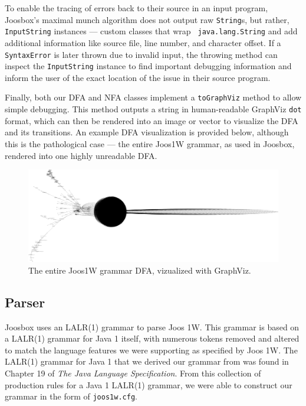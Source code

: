 \documentclass[letterpaper]{article}
\begin{document}
  To enable the tracing of errors back to their source in an input program,
  Joosbox's maximal munch algorithm does not output raw {\tt String}s, but
  rather, {\tt InputString} instances --- custom classes that wrap {\tt
  java.lang.String} and add additional information like source file, line
  number, and character offset. If a {\tt SyntaxError} is later thrown due to
  invalid input, the throwing method can inspect the {\tt InputString}
  instance to find important debugging information and inform the user of the
  exact location of the issue in their source program.

  Finally, both our DFA and NFA classes implement a {\tt toGraphViz} method to
  allow simple debugging. This method outputs a string in human-readable GraphViz {\tt dot}
  format, which can then be rendered into an image or vector to visualize the
  DFA and its transitions. An example DFA visualization is provided below, although
  this is the pathological case --- the entire Joos1W grammar, as used in Joosbox, rendered
  into one highly unreadable DFA.

  \begin{figure}[h!]
    \caption{The entire Joos1W grammar DFA, vizualized with GraphViz.}
    \centering
      \includegraphics[width=1\textwidth]{thejoosdfa.png}
  \end{figure}

  \subsection{Parser}

  Joosbox uses an LALR(1) grammar to parse Joos 1W. This grammar is based on a
  LALR(1) grammar for Java 1 itself, with numerous tokens removed and altered to
  match the language features we were supporting as specified by Joos 1W. The
  LALR(1) grammar for Java 1 that we derived our grammar from was found in
  Chapter 19 of {\em The Java Language Specification}. From this collection of
  production rules for a Java 1 LALR(1) grammar, we were able to construct our
  grammar in the form of {\tt joos1w.cfg}.
\end{document}
